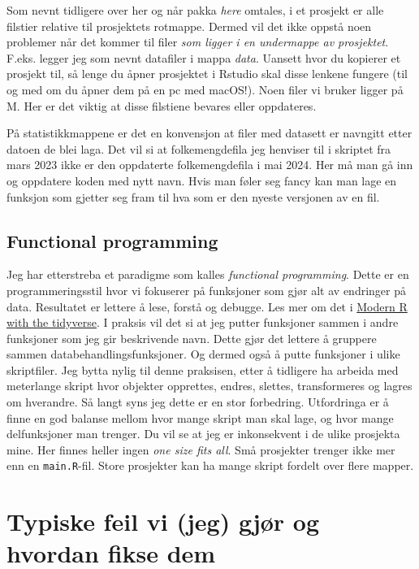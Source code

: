 \documentclass[
  letterpaper,
  DIV=11,
  numbers=noendperiod]{scrreprt}
\begin{document}
Som nevnt tidligere over her og når pakka \emph{here} omtales, i et
prosjekt er alle filstier relative til prosjektets rotmappe. Dermed vil
det ikke oppstå noen problemer når det kommer til filer \emph{som ligger
i en undermappe av prosjektet}. F.eks. legger jeg som nevnt datafiler i
mappa \emph{data}. Uansett hvor du kopierer et prosjekt til, så lenge du
åpner prosjektet i Rstudio skal disse lenkene fungere (til og med om du
åpner dem på en pc med macOS!). Noen filer vi bruker ligger på M. Her er
det viktig at disse filstiene bevares eller oppdateres.

På statistikkmappene er det en konvensjon at filer med datasett er
navngitt etter datoen de blei laga. Det vil si at folkemengdefila jeg
henviser til i skriptet fra mars 2023 ikke er den oppdaterte
folkemengdefila i mai 2024. Her må man gå inn og oppdatere koden med
nytt navn. Hvis man føler seg fancy kan man lage en funksjon som gjetter
seg fram til hva som er den nyeste versjonen av en fil.

\hypertarget{functional-programming}{%
\section{Functional programming}\label{functional-programming}}

Jeg har etterstreba et paradigme som kalles \emph{functional
programming}. Dette er en programmeringsstil hvor vi fokuserer på
funksjoner som gjør alt av endringer på data. Resultatet er lettere å
lese, forstå og debugge. Les mer om det i
\href{http://modern-rstats.eu/functional-programming.html}{Modern R with
the tidyverse}. I praksis vil det si at jeg putter funksjoner sammen i
andre funksjoner som jeg gir beskrivende navn. Dette gjør det lettere å
gruppere sammen databehandlingsfunksjoner. Og dermed også å putte
funksjoner i ulike skriptfiler. Jeg bytta nylig til denne praksisen,
etter å tidligere ha arbeida med meterlange skript hvor objekter
opprettes, endres, slettes, transformeres og lagres om hverandre. Så
langt syns jeg dette er en stor forbedring. Utfordringa er å finne en
god balanse mellom hvor mange skript man skal lage, og hvor mange
delfunksjoner man trenger. Du vil se at jeg er inkonsekvent i de ulike
prosjekta mine. Her finnes heller ingen \emph{one size fits all}. Små
prosjekter trenger ikke mer enn en \texttt{main.R}-fil. Store prosjekter
kan ha mange skript fordelt over flere mapper.


\hypertarget{sec-feil}{%
\chapter{Typiske feil vi (jeg) gjør og hvordan fikse
dem}\label{sec-feil}}
\end{document}

